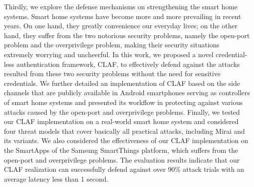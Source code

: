 {    Thirdly, we explore the defense mechanisms on strengthening the smart home systems. Smart home systems have become more and more prevailing in recent years. On one hand, they greatly convenience our everyday lives; on the other hand, they suffer from the two notorious security problems, namely the open-port problem and the overprivilege problem, making their security situations extremely worrying and uncheerful. In this work, we proposed a novel credential-less authentication framework, CLAF, to effectively defend against the attacks resulted from these two security problems without the need for sensitive credentials. We further detailed an implementation of CLAF based on the side channels that are publicly available in Android smartphones serving as controllers of smart home systems and presented its workflow in protecting against various attacks caused by the open-port and overprivilege problems. Finally, we tested our CLAF implementation on a real-world smart home system and considered four threat models that cover basically all practical attacks, including Mirai and its variants. We also considered the effectiveness of our CLAF implementation on the SmartApps of the Samsung SmartThings platform, which suffers from the open-port and overprivilege problems. The evaluation results indicate that our CLAF realization can successfully defend against over 90\% attack trials with an average latency less than 1 second.
}
